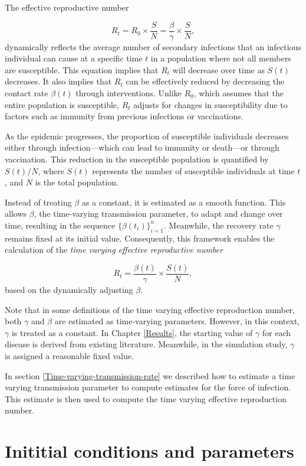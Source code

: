 \documentclass[
11pt, %
oneside, %
english, %
singlespacing, %
]{macthesis} %
\begin{document}
The effective reproductive number

\[
R_t = R_0 \times \frac{S}{N} = \frac{\beta}{\gamma} \times \frac{S}{N},
\]
dynamically reflects the average number of secondary infections that an infectious individual can cause at a specific time \(t\) in a population where not all members are susceptible. This equation implies that \(R_t\) will decrease over time as \(S(t)\) decreases. It also implies that \(R_t\) can be effectively reduced by decreasing the contact rate \(\beta(t)\) through interventions. Unlike \(R_0\), which assumes that the entire population is susceptible, \(R_t\) adjusts for changes in susceptibility due to factors such as immunity from previous infections or vaccinations.

As the epidemic progresses, the proportion of susceptible individuals decreases either through infection---which can lead to immunity or death---or through vaccination. This reduction in the susceptible population is quantified by \(S(t)/N\), where \(S(t)\) represents the number of susceptible individuals at time \(t\), and \(N\) is the total population.

Instead of treating \(\beta\) as a constant, it is estimated as a smooth function. This allows \(\beta\), the time-varying transmission parameter, to adapt and change over time, resulting in the sequence \(\{\beta(t_i)\}_{i=1}^n\). Meanwhile, the recovery rate \(\gamma\) remains fixed at its initial value. Consequently, this framework enables the calculation of the \emph{time varying effective reproductive number}

\[
     R_t = \frac{\beta(t)}{\gamma} \times \frac{S(t)}{N},
\]
based on the dynamically adjusting \(\beta\).

Note that in some definitions of the time varying effective reproduction number, both \(\gamma\) and \(\beta\) are estimated as time-varying parameters. However, in this context, \(\gamma\) is treated as a constant. In Chapter \ref{Results}, the starting value of \(\gamma\) for each disease is derived from existing literature. Meanwhile, in the simulation study, \(\gamma\) is assigned a reasonable fixed value.

In section \ref{Time-varying-transmission-rate} we described how to estimate a time varying transmission parameter to compute estimates for the force of infection. This estimate is then used to compute the time varying effective reproduction number.

\section{Inititial conditions and parameters}\label{Initial-conditions-and-parameters}
\end{document}

